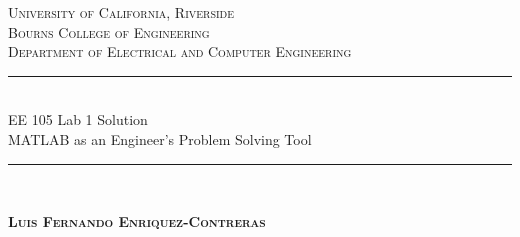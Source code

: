 \documentclass[12pt]{article}
\begin{document}
	\begin{titlepage}
		
		\newcommand{\HRule}{\rule{\linewidth}{0.5mm}} %
		
		\center %
		
		
		\textsc{\LARGE University of California, Riverside}\\[1.5cm] %
		\textsc{\Large Bourns College of Engineering}\\[0.5cm] %
		\textsc{\large Department of Electrical and Computer Engineering}\\[0.5cm] %
		
		
		\HRule \\[0.6cm]
		{\Large EE 105 Lab 1 Solution \\ \normalsize MATLAB as an Engineer’s Problem Solving Tool}\\[0.4cm] %
		\HRule \\[1.0cm]
		
		
		\begin{center} \large
			\medskip
			{\textsc{\textbf{Luis Fernando Enriquez-Contreras} }} 
		\end{center}
		
		
		\begin{center}
			{\large }
		\end{center}
		

\end{titlepage}
\end{document}

